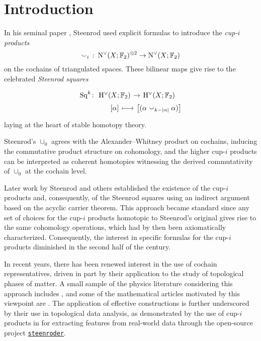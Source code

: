 
\section{Introduction}\label{s:introduction}

In his seminal paper \cite{steenrod1947products}, Steenrod used explicit formulas to introduce the \textit{cup-$i$ products}
\[
\smallsmile_i\ \colon \operatorname{N^{\vee}}(X; {\mathbb{F}_2})^{\otimes 2} \to \operatorname{N^{\vee}}(X; {\mathbb{F}_2})
\]
on the cochains of triangulated spaces.
These bilinear maps give rise to the celebrated \textit{Steenrod squares}
\[
\begin{tikzcd}[column sep=0, row sep=0]
	\Sq^k \colon &[-5pt] \rH^\vee(X; \F) \rar & \rH^\vee(X; \F) \\
	& {[\alpha]} \rar[maps to] & \big[(\alpha \cup_{k-\bars{\alpha}} \alpha)\big]
\end{tikzcd}
\]
laying at the heart of stable homotopy theory.

Steenrod's $\cup_0$ agrees with the Alexander--Whitney product on cochains, inducing the commutative product structure on cohomology, and the higher cup-$i$ products can be interpreted as coherent homotopies witnessing the derived commutativity of $\cup_0$ at the cochain level.

Later work by Steenrod and others established the existence of the cup-$i$ products and, consequently, of the Steenrod squares using an indirect argument based on the acyclic carrier theorem.
This approach became standard since any set of choices for the cup-$i$ products homotopic to Steenrod's original gives rise to the same cohomology operations, which had by then been axiomatically characterized.
Consequently, the interest in specific formulas for the cup-$i$ products diminished in the second half of the century.

In recent years, there has been renewed interest in the use of cochain representatives, driven in part by their application to the study of topological phases of matter.
A small sample of the physics literature considering this approach includes \cite{gaiotto2016spin, kapustin2017fermionic, meng2018classification, wang2020construction, barkeshli2021classification, tata2021anomalies, tata2021cubical}, and some of the mathematical articles motivated by this viewpoint are \cite{brumfiel2016pontrjagin, brumfiel2018pontrjagin, medina2020cartan, medina2021adem}.
The application of effective constructions is further underscored by their use in topological data analysis, as demonstrated by the use of cup-$i$ products in \cite{medina2022per_st} for extracting features from real-world data through the open-source project \href{https://github.com/Steenroder/steenroder}{\texttt{steenroder}}.

